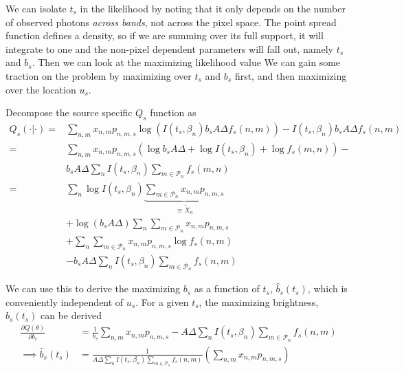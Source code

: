 \documentclass[11pt]{article}
\newcommand{\trans}{\intercal}
\begin{document}
\begin{itemize}
We can isolate $t_s$ in the likelihood by noting that it only depends on the number of observed photons \emph{across bands}, not across the pixel space. The point spread function defines a density, so if we are summing over its full support, it will integrate to one and the non-pixel dependent parameters will fall out, namely $t_s$ and $b_s$.  Then we can look at the maximizing likelihood value We can gain some traction on the problem by maximizing over $t_s$ and $b_s$ first, and then maximizing over the location $u_s$.  

Decompose the source specific $Q_s$ function as 
\begin{align*}
Q_s(\cdot | \cdot) 
  =& \sum_{n,m} x_{n,m} p_{n,m,s} \log\left(I(t_s,\beta_n) b_s A \Delta f_s(n,m) \right) - I(t_s,\beta_n) b_s A \Delta f_s(n,m)\\
  =& \sum_{n,m} x_{n,m} p_{n,m,s} \left(\log b_s A \Delta + \log I(t_s, \beta_n) + \log f_s(m,n) \right) - \\
   & b_s A \Delta \sum_{n} I(t_s, \beta_n) \sum_{m \in \mathcal{P}_n} f_s(m,n) \\
  =& \sum_{n} \log I(t_s, \beta_n) \underbrace{\sum_{m \in \mathcal{P}_n} x_{n,m} p_{n,m,s}}_{\equiv \tilde X_n} \\
   & + \log (b_s A \Delta) \sum_{n} \sum_{m \in \mathcal{P}_n} x_{n,m} p_{n,m,s} \\
   & + \sum_{n} \sum_{m \in \mathcal{P}_n} x_{n,m} p_{n,m,s} \log f_s(n,m) \\
   & - b_s A \Delta \sum_{n} I(t_s, \beta_n) \sum_{m \in \mathcal{P}_n} f_s(n,m)
\end{align*}

We can use this to derive the maximizing $b_s$ as a function of $t_s$, $\hat b_s(t_s)$, which is conveniently independent of $u_s$.  For a given $t_s$, the maximizing brightness, $\hat b_s(t_s)$ can be derived
\begin{align}
  \frac{\partial Q(\theta)}{\partial b_s} 
    &= \frac{1}{b_s} \sum_{n,m} x_{n,m} p_{n,m,s} - A \Delta \sum_{n} I(t_s, \beta_n) \sum_{m \in \mathcal{P}_n} f_s(n,m) \\
  \implies 
  \hat b_s(t_s) &= \frac{1}{A \Delta \sum_n I(t_s, \beta_n) \sum_{m \in \mathcal{P}_n} f_s(n,m)
} \left( \sum_{n,m} x_{n,m} p_{n,m,s} \right)  
\end{align}


\end{itemize}
\end{document}
